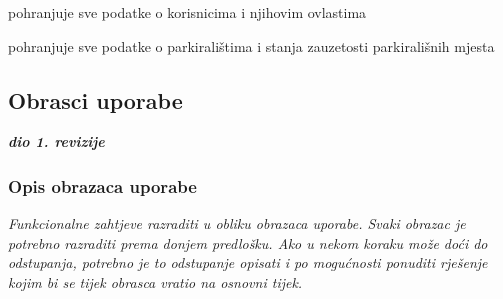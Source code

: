                 \begin{packed_enum}
				\item  {}
				
				\begin{packed_enum}
					
					
					\item pohranjuje sve podatke o korisnicima i njihovim ovlastima
					\item pohranjuje sve podatke o parkiralištima i stanja zauzetosti parkirališnih mjesta
					
					
				\end{packed_enum}
                \end{packed_enum}
			
			\eject 
			
			
				
			\subsection{Obrasci uporabe}
				
				\textbf{\textit{dio 1. revizije}}
				
				\subsubsection{Opis obrazaca uporabe}
					\textit{Funkcionalne zahtjeve razraditi u obliku obrazaca uporabe. Svaki obrazac je potrebno razraditi prema donjem predlošku. Ako u nekom koraku može doći do odstupanja, potrebno je to odstupanje opisati i po mogućnosti ponuditi rješenje kojim bi se tijek obrasca vratio na osnovni tijek.}\\
					

